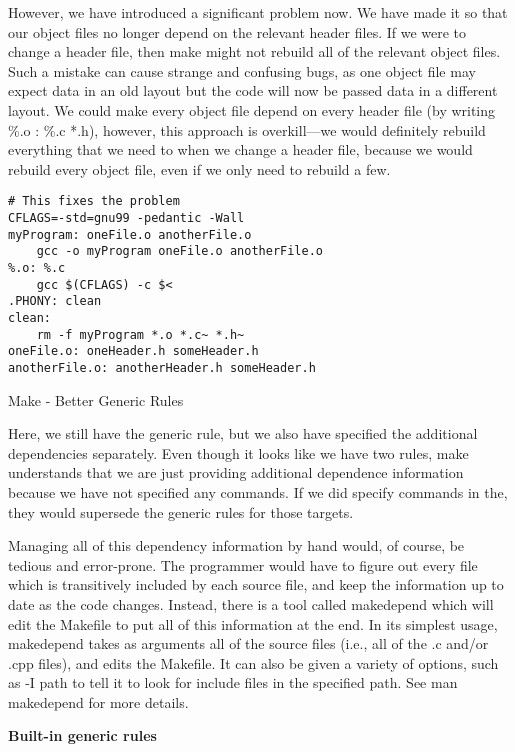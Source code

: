 \documentclass[11pt, a4paper]{article}
\begin{document}
However, we have introduced a significant problem now. We have made it so that our object files no longer depend on the relevant header files. If we were to change a header file, then make might not rebuild all of the relevant object files. Such a mistake can cause strange and confusing bugs, as one object file may expect data in an old layout but the code will now be passed data in a different layout. We could make every object file depend on every header file (by writing \%.o : \%.c *.h), however, this approach is overkill—we would definitely rebuild everything that we need to when we change a header file, because we would rebuild every object file, even if we only need to rebuild a few.

\begin{listing}
\begin{verbatim}
# This fixes the problem
CFLAGS=-std=gnu99 -pedantic -Wall
myProgram: oneFile.o anotherFile.o
    gcc -o myProgram oneFile.o anotherFile.o
%.o: %.c
    gcc $(CFLAGS) -c $<
.PHONY: clean
clean:
    rm -f myProgram *.o *.c~ *.h~
oneFile.o: oneHeader.h someHeader.h
anotherFile.o: anotherHeader.h someHeader.h
\end{verbatim}
\caption{Make - Better Generic Rules}
\label{lst:make_better_generic_rules}
\end{listing}


Here, we still have the generic rule, but we also have specified the additional dependencies separately. Even though it looks like we have two rules, make understands that we are just providing additional dependence information because we have not specified any commands. If we did specify commands in the, they would supersede the generic rules for those targets.

Managing all of this dependency information by hand would, of course, be tedious and error-prone. The programmer would have to figure out every file which is transitively included by each source file, and keep the information up to date as the code changes. Instead, there is a tool called makedepend which will edit the Makefile to put all of this information at the end. In its simplest usage, makedepend takes as arguments all of the source files (i.e., all of the .c and/or .cpp files), and edits the Makefile. It can also be given a variety of options, such as -I path to tell it to look for include files in the specified path. See man makedepend for more details.


\textbf{Built-in generic rules}
\end{document}
